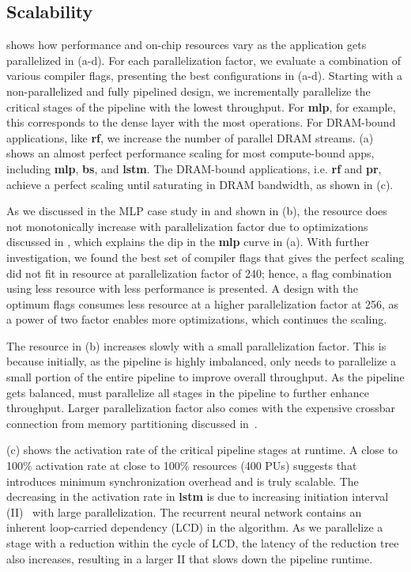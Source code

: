 \subsection{Scalability}
 shows how performance and on-chip resources vary as the application gets parallelized in
(a-d). 
For each parallelization factor, we evaluate a combination of various compiler flags, presenting the
best configurations in (a-d).
Starting with a non-parallelized and fully pipelined design, 
we incrementally parallelize the critical stages of the pipeline with the lowest throughput.
For \textbf{mlp}, for example, this corresponds to the dense layer with the most operations.
For DRAM-bound applications, like \textbf{rf}, we increase the number of parallel DRAM streams.
 (a) shows an almost perfect performance scaling for most compute-bound apps, including
\textbf{mlp}, \textbf{bs}, and \textbf{lstm}.
The DRAM-bound applications, i.e. \textbf{rf} and \textbf{pr}, achieve a perfect scaling until
saturating in DRAM bandwidth, as shown in (c).

As we discussed in the MLP case study in  and shown in (b), the resource does not
monotonically increase with parallelization factor due to optimizations discussed in ,
which explains the dip in the \textbf{mlp} curve in (a). 
With further investigation, we found the best set of compiler flags that gives the perfect scaling 
did not fit in resource at parallelization factor of 240; hence, a flag combination using less
resource with less performance is presented. 
A design with the optimum flags consumes less resource at a higher parallelization factor at 256, 
as a power of two factor enables more optimizations, which continues the scaling.

The resource in (b) increases slowly with a small parallelization factor. This is because initially,
as the pipeline is highly imbalanced, \name only needs to parallelize a small portion of the
entire pipeline to improve overall throughput. As the pipeline gets balanced, \name must parallelize
all stages in the pipeline to further enhance throughput. Larger parallelization factor also comes
with the expensive crossbar connection from memory partitioning discussed in~.

 (c) shows the activation rate of the critical pipeline stages at runtime.
A close to 100\% activation rate at close to 100\% resources (400 PUs) suggests that 
\name introduces minimum synchronization overhead and is truly scalable.
The decreasing in the activation rate in \textbf{lstm} is due to increasing initiation interval
(II)~\cite{II} with large parallelization.
The recurrent neural network contains an inherent loop-carried dependency (LCD) in the algorithm. 
As we parallelize a stage with a reduction within the cycle of LCD, the latency of the reduction tree
also increases, resulting in a larger II that slows down the pipeline runtime.

